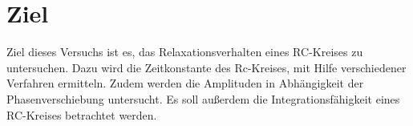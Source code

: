 \section{Ziel}
Ziel dieses Versuchs ist es, das Relaxationsverhalten eines RC-Kreises zu untersuchen.
Dazu wird die Zeitkonstante des Rc-Kreises, mit Hilfe verschiedener Verfahren ermitteln. 
Zudem werden die Amplituden in Abhängigkeit der Phasenverschiebung untersucht. 
Es soll außerdem die Integrationsfähigkeit eines RC-Kreises betrachtet werden.